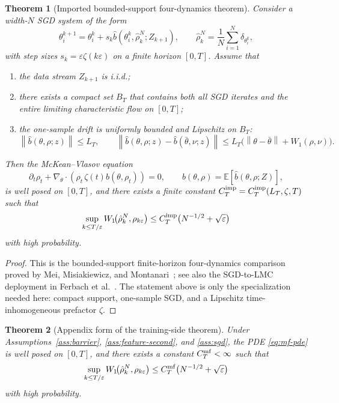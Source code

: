 \documentclass[11pt]{article}
\newtheorem{theorem}{Theorem}[section]
\theoremstyle{definition}
\newcommand{\E}{\mathbb{E}}
\newcommand{\norm}[1]{\left\lVert #1 \right\rVert}
\begin{document}
\begin{theorem}[Imported bounded-support four-dynamics theorem]
\label{thm:imported-four-dynamics}
Consider a width-$N$ SGD system of the form
\[
  \theta_i^{k+1}
  =
  \theta_i^k+s_k\hat b(\theta_i^k,\hat\rho_k^N;Z_{k+1}),
  \qquad
  \hat\rho_k^N=\frac1N\sum_{i=1}^N \delta_{\theta_i^k},
\]
with step sizes $s_k=\varepsilon\zeta(k\varepsilon)$ on a finite horizon
$[0,T]$. Assume that
\begin{enumerate}[label=(\roman*)]
  \item the data stream $Z_{k+1}$ is i.i.d.;
  \item there exists a compact set $B_T$ that contains both all SGD iterates
  and the entire limiting characteristic flow on $[0,T]$;
  \item the one-sample drift is uniformly bounded and Lipschitz on $B_T$:
  \[
    \norm{\hat b(\theta,\rho;z)}\le L_T,
    \qquad
    \norm{\hat b(\theta,\rho;z)-\hat b(\bar\theta,\nu;z)}
    \le
    L_T\bigl(\norm{\theta-\bar\theta}+W_1(\rho,\nu)\bigr).
  \]
\end{enumerate}
Then the McKean--Vlasov equation
\[
  \partial_t \rho_t+\nabla_\theta\cdot(\rho_t\,\zeta(t)b(\theta,\rho_t))=0,
  \qquad
  b(\theta,\rho)=\E[\hat b(\theta,\rho;Z)],
\]
is well posed on $[0,T]$, and there exists a finite constant
$C_T^{\rm imp}=C_T^{\rm imp}(L_T,\zeta,T)$ such that
\[
  \sup_{k\le T/\varepsilon}
  W_1\!\bigl(\hat\rho_k^N,\rho_{k\varepsilon}\bigr)
  \le
  C_T^{\rm imp}\bigl(N^{-1/2}+\sqrt{\varepsilon}\bigr)
\]
with high probability.
\end{theorem}

\begin{proof}
This is the bounded-support finite-horizon four-dynamics comparison proved by
Mei, Misiakiewicz, and Montanari~\cite{MeiMisiakiewiczMontanari2019}; see also
the SGD-to-LMC deployment in Ferbach et al.~\cite{Ferbach2024}. The statement
above is only the specialization needed here: compact support, one-sample SGD,
and a Lipschitz time-inhomogeneous prefactor $\zeta$.
\end{proof}

\begin{theorem}[Appendix form of the training-side theorem]
\label{thm:sgd-mf}
Under Assumptions~\ref{ass:barrier}, \ref{ass:feature-second}, and
\ref{ass:sgd}, the PDE \eqref{eq:mf-pde} is well posed on $[0,T]$, and there
exists a constant $C_T^{\rm mf}<\infty$ such that
\[
  \sup_{k\le T/\varepsilon}
  W_1\!\bigl(\hat\rho_k^N,\rho_{k\varepsilon}\bigr)
  \le
  C_T^{\rm mf}\bigl(N^{-1/2}+\sqrt{\varepsilon}\bigr)
\]
with high probability.
\end{theorem}
\end{document}
